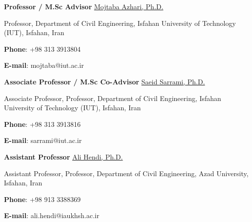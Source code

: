 

\vspace{9pt}
\begin{cventries}
  \cventry
{\textbf{Professor / M.Sc Advisor}} %
{\href{https://scholar.google.com/citations?user=ZSDFbf4AAAAJ&hl=en}{Mojtaba Azhari, Ph.D.}} %
{} %
{} %
{
	\begin{cvitems} %
		\item {Professor, Department of Civil Engineering, Isfahan University of Technology (IUT), Isfahan, Iran}
		\item {\textbf{Phone}: +98 313 3913804}
		\item {\textbf{E-mail}: mojtaba@iut.ac.ir}
	\end{cvitems}
}

\vspace{1pt}

\cventry
 {\textbf{Associate Professor / M.Sc Co-Advisor}} %
 {\href{https://scholar.google.com/citations?hl=en&user=rUy_5DEAAAAJ}{Saeid Sarrami, Ph.D.}} %
 {} %
 {} %
 {
 	\begin{cvitems} %
 		\item {Associate Professor, Professor, Department of Civil Engineering, Isfahan University of Technology (IUT), Isfahan, Iran}
 		\item {\textbf{Phone}: +98 313 3913816}
 		\item {\textbf{E-mail}: sarrami@iut.ac.ir}
 	\end{cvitems}
 }

\vspace{9pt}

\cventry
 {\textbf{Assistant Professor}} %
{\href{https://scholar.google.com/citations?user=uvR1qaoAAAAJ&hl=en&oi=ao}{Ali Hendi, Ph.D.}} %
{} %
{} %
{
	\begin{cvitems} %
		\item {Assistant Professor, Professor, Department of Civil Engineering, Azad University, Isfahan, Iran}
		\item {\textbf{Phone}: +98 913 3388369}
		\item {\textbf{E-mail}: ali.hendi@iaukhsh.ac.ir}
	\end{cvitems}
}
\end{cventries}
